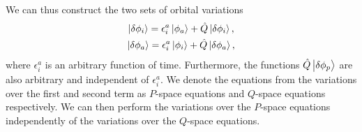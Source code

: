             We can thus construct the two sets of orbital variations
            \begin{gather}
                \ket{\delta\phi_i}
                = \epsilon^{a}_{i}\ket{\phi_a}
                + \hat{Q}\ket{\delta\phi_i},
                \\
                \ket{\delta\phi_a}
                = \epsilon^{a}_{i}\ket{\phi_i}
                + \hat{Q}\ket{\delta\phi_a},
            \end{gather}
            where $\epsilon^{a}_{i}$ is an arbitrary function of time.
            Furthermore, the functions $\hat{Q}\ket{\delta\phi_p}$ are also
            arbitrary and independent of $\epsilon^{a}_{i}$.
            We denote the equations from the variations over the first and
            second term as $P$-space equations and $Q$-space equations
            respectively.
            We can then perform the variations over the $P$-space equations
            independently of the variations over the $Q$-space equations.

